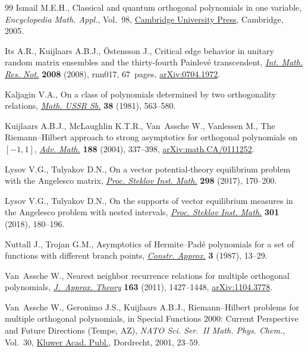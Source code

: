 \documentclass[pdftex]{sigma}
\numberwithin{equation}{section}
\begin{document}
\begin{thebibliography}{99}
Ismail M.E.H., Classical and quantum orthogonal polynomials in one variable,
 \textit{Encyclopedia Math. Appl.}, Vol.~98,
 \href{https://doi.org/10.1017/CBO9781107325982}{Cambridge University Press},
 Cambridge, 2005.

Its A.R., Kuijlaars A.B.J., \"Ostensson J., Critical edge behavior in unitary
 random matrix ensembles and the thirty-fourth {P}ainlev\'e transcendent,
 \href{https://doi.org/10.1093/imrn/rnn017}{\textit{Int. Math. Res. Not.}}
 \textbf{2008} (2008), rnn017, 67~pages, \href{http://arxiv.org/abs/0704.1972}{arXiv:0704.1972}.

Kaljagin V.A., On a class of polynomials determined by two orthogonality
 relations,
 \href{https://doi.org/10.1070/SM1981v038n04ABEH001465}{\textit{Math. USSR
 Sb.}} \textbf{38} (1981), 563--580.

Kuijlaars A.B.J., McLaughlin K.T.R., Van~Assche W., Vanlessen M., The
 {R}iemann--{H}ilbert approach to strong asymptotics for orthogonal
 polynomials on~{$[-1,1]$},
 \href{https://doi.org/10.1016/j.aim.2003.08.015}{\textit{Adv. Math.}}
 \textbf{188} (2004), 337--398, \href{http://arxiv.org/abs/math.CA/0111252}{arXiv:math.CA/0111252}.

Lysov V.G., Tulyakov D.N., On a vector potential-theory equilibrium problem
 with the {A}ngelesco matrix,
 \href{https://doi.org/10.1134/s008154381706013x}{\textit{Proc. Steklov Inst.
 Math.}} \textbf{298} (2017), 170--200.

Lysov V.G., Tulyakov D.N., On the supports of vector equilibrium measures in
 the {A}ngelesco problem with nested intervals,
 \href{https://doi.org/10.1134/S0081543818040144}{\textit{Proc. Steklov Inst.
 Math.}} \textbf{301} (2018), 180--196.

Nuttall J., Trojan G.M., Asymptotics of {H}ermite--{P}ad\'e polynomials for a
 set of functions with different branch points,
 \href{https://doi.org/10.1007/BF01890550}{\textit{Constr. Approx.}}
 \textbf{3} (1987), 13--29.

Van~Assche W., Nearest neighbor recurrence relations for multiple orthogonal
 polynomials,
 \href{https://doi.org/10.1016/j.jat.2011.05.003}{\textit{J.~Approx. Theory}}
 \textbf{163} (2011), 1427--1448, \href{http://arxiv.org/abs/1104.3778}{arXiv:1104.3778}.

Van~Assche W., Geronimo J.S., Kuijlaars A.B.J., Riemann--{H}ilbert problems for
 multiple orthogonal polynomials, in Special {F}unctions 2000: {C}urrent
 {P}erspective and {F}uture {D}irections ({T}empe, {AZ}), \textit{NATO Sci.
 Ser.~II Math. Phys. Chem.}, Vol.~30,
 \href{https://doi.org/10.1007/978-94-010-0818-1_2}{Kluwer Acad. Publ.},
 Dordrecht, 2001, 23--59.


\end{thebibliography}
\end{document}
